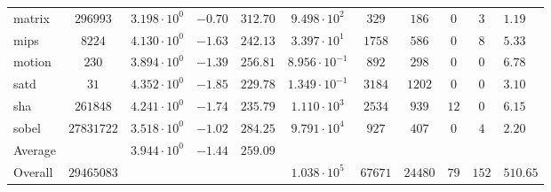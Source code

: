 \begin{tabular}{|l|c|HHc|c|c|c|c|cH|}
matrix        & $ 296993   $ & $ 3.198 \cdot 10^{0} $ & $ -0.70 $ & $ 312.70 $ & $ 9.498 \cdot 10^{2}  $ & $ 329   $ & $ 186   $ & $ 0   $ & $ 3   $ & $ 1.19    $ \\
mips          & $ 8224     $ & $ 4.130 \cdot 10^{0} $ & $ -1.63 $ & $ 242.13 $ & $ 3.397 \cdot 10^{1}  $ & $ 1758  $ & $ 586   $ & $ 0   $ & $ 8   $ & $ 5.33    $ \\
motion        & $ 230      $ & $ 3.894 \cdot 10^{0} $ & $ -1.39 $ & $ 256.81 $ & $ 8.956 \cdot 10^{-1} $ & $ 892   $ & $ 298   $ & $ 0   $ & $ 0   $ & $ 6.78    $ \\
satd          & $ 31       $ & $ 4.352 \cdot 10^{0} $ & $ -1.85 $ & $ 229.78 $ & $ 1.349 \cdot 10^{-1} $ & $ 3184  $ & $ 1202  $ & $ 0   $ & $ 0   $ & $ 3.10    $ \\
sha           & $ 261848   $ & $ 4.241 \cdot 10^{0} $ & $ -1.74 $ & $ 235.79 $ & $ 1.110 \cdot 10^{3}  $ & $ 2534  $ & $ 939   $ & $ 12  $ & $ 0   $ & $ 6.15    $ \\
sobel         & $ 27831722 $ & $ 3.518 \cdot 10^{0} $ & $ -1.02 $ & $ 284.25 $ & $ 9.791 \cdot 10^{4}  $ & $ 927   $ & $ 407   $ & $ 0   $ & $ 4   $ & $ 2.20    $ \\
\hline
Average       & $          $ & $ 3.944 \cdot 10^{0} $ & $ -1.44 $ & $ 259.09 $ & $                     $ & $       $ & $       $ & $     $ & $     $ & $         $ \\
\hline
Overall       & $ 29465083 $ & $                    $ & $       $ & $        $ & $ 1.038 \cdot 10^{5}  $ & $ 67671 $ & $ 24480 $ & $ 79  $ & $ 152 $ & $ 510.65  $ \\
\hline
\end{tabular}
